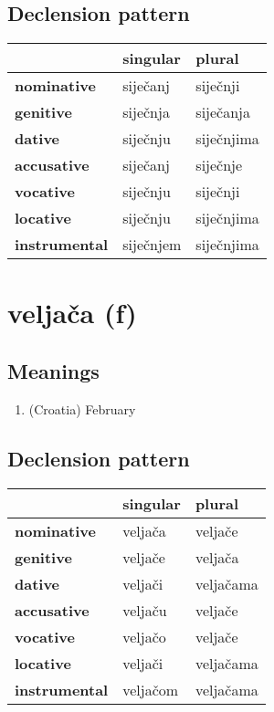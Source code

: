 \subsection*{Declension pattern}
\begin{tabularx}{\linewidth}{Xll}
\toprule
{} &   singular &      plural \\
\midrule
\textbf{nominative  } &   siječanj &    siječnji \\
\textbf{genitive    } &   siječnja &   siječanja \\
\textbf{dative      } &   siječnju &  siječnjima \\
\textbf{accusative  } &   siječanj &    siječnje \\
\textbf{vocative    } &   siječnju &    siječnji \\
\textbf{locative    } &   siječnju &  siječnjima \\
\textbf{instrumental} &  siječnjem &  siječnjima \\
\bottomrule
\end{tabularx}

\filbreak
\section{veljača (f)}
\subsection*{Meanings}
\begin{enumerate}
\item (Croatia) February
\end{enumerate}
\subsection*{Declension pattern}
\begin{tabularx}{\linewidth}{Xll}
\toprule
{} &  singular &     plural \\
\midrule
\textbf{nominative  } &   veljača &    veljače \\
\textbf{genitive    } &   veljače &    veljača \\
\textbf{dative      } &   veljači &  veljačama \\
\textbf{accusative  } &   veljaču &    veljače \\
\textbf{vocative    } &   veljačo &    veljače \\
\textbf{locative    } &   veljači &  veljačama \\
\textbf{instrumental} &  veljačom &  veljačama \\
\bottomrule
\end{tabularx}

